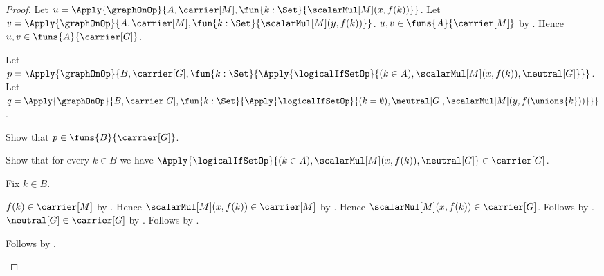 \begin{proof}
    Let $u=\Apply{\graphOnOp}{
        A,\carrier[M],
        \fun{k:\Set}{\scalarMul[M](x,f(k))}}$.
    Let $v=\Apply{\graphOnOp}{
        A,\carrier[M],
        \fun{k:\Set}{\scalarMul[M](y,f(k))}}$.
    $u,v\in\funs{A}{\carrier[M]}$ by
        .
    Hence $u,v\in\funs{A}{\carrier[G]}$.

    Let $p=\Apply{\graphOnOp}{
        B,\carrier[G],
        \fun{k:\Set}{
            \Apply{\logicalIfSetOp}{
                (k\in A),\scalarMul[M](x,f(k)),\neutral[G]}}}$.
    Let $q=\Apply{\graphOnOp}{
        B,\carrier[G],
        \fun{k:\Set}{
            \Apply{\logicalIfSetOp}{
                (k=\emptyset),\neutral[G],
                \scalarMul[M](y,f(\unions{k}))}}}$.

    Show that $p\in\funs{B}{\carrier[G]}$.
    \begin{subproof}
        Show that for every $k\in B$ we have
            $\Apply{\logicalIfSetOp}{
                (k\in A),\scalarMul[M](x,f(k)),\neutral[G]}
                \in\carrier[G]$.
        \begin{subproof}
            Fix $k\in B$.
            \begin{byCase}
                    $f(k)\in\carrier[M]$ by
                        .
                    Hence $\scalarMul[M](x,f(k))\in\carrier[M]$ by
                        .
                    Hence $\scalarMul[M](x,f(k))\in\carrier[G]$.
                    Follows by .
                    $\neutral[G]\in\carrier[G]$ by
                        .
                    Follows by .
            \end{byCase}
        \end{subproof}
        Follows by .
    \end{subproof}


\end{proof}
